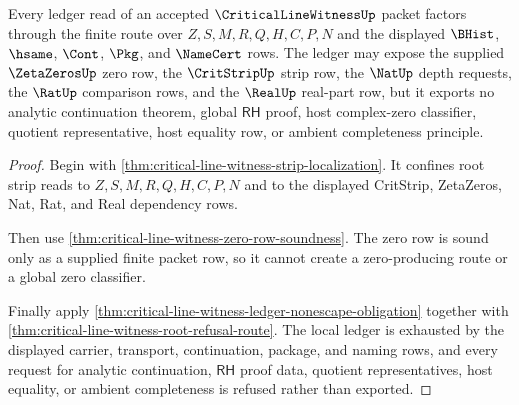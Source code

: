 \begin{theorem}
\label{thm:critical-line-witness-ledger-nonescape}
Every ledger read of an accepted $\CriticalLineWitnessUp$ packet factors through the finite route over $Z,S,M,R,Q,H,C,P,N$ and the displayed $\BHist$, $\hsame$, $\Cont$, $\Pkg$, and $\NameCert$ rows. The ledger may expose the supplied $\ZetaZerosUp$ zero row, the $\CritStripUp$ strip row, the $\NatUp$ depth requests, the $\RatUp$ comparison rows, and the $\RealUp$ real-part row, but it exports no analytic continuation theorem, global $\mathsf{RH}$ proof, host complex-zero classifier, quotient representative, host equality row, or ambient completeness principle.
\end{theorem}
\begin{proof}
Begin with \autoref{thm:critical-line-witness-strip-localization}. It confines root strip reads to $Z,S,M,R,Q,H,C,P,N$ and to the displayed CritStrip, ZetaZeros, Nat, Rat, and Real dependency rows.

Then use \autoref{thm:critical-line-witness-zero-row-soundness}. The zero row is sound only as a supplied finite packet row, so it cannot create a zero-producing route or a global zero classifier.

Finally apply \autoref{thm:critical-line-witness-ledger-nonescape-obligation} together with \autoref{thm:critical-line-witness-root-refusal-route}. The local ledger is exhausted by the displayed carrier, transport, continuation, package, and naming rows, and every request for analytic continuation, $\mathsf{RH}$ proof data, quotient representatives, host equality, or ambient completeness is refused rather than exported.
\end{proof}
